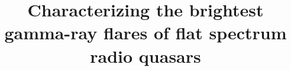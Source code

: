 \documentclass[twocolumn]{aastex62}
\begin{document}
\title{Characterizing the brightest gamma-ray flares of flat spectrum radio quasars}


\end{document}
